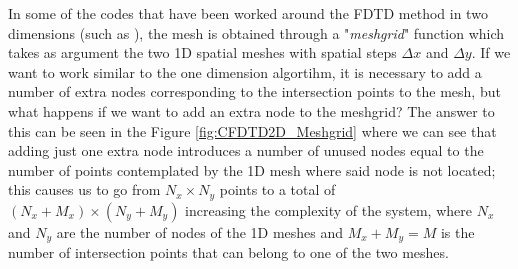\documentclass[12pt, oneside]{book}
\begin{document}
In some of the codes that have been worked around the FDTD method in two dimensions (such as \cite{Angulo_PyDG1D_2024}), the mesh is obtained through a "\textit{meshgrid}" function \cite{harris2020array} which takes as argument the two 1D spatial meshes with spatial steps $\Delta x$ and $\Delta y$. If we want to work similar to the one dimension algortihm, it is necessary to add a number of extra nodes corresponding to the intersection points to the mesh, but what happens if we want to add an extra node to the meshgrid? The answer to this can be seen in the Figure \ref{fig:CFDTD2D_Meshgrid} where we can see that adding just one extra node introduces a number of unused nodes equal to the number of points contemplated by the 1D mesh where said node is not located; this causes us to go from $N_x \times N_y$ points to a total of $(N_x + M_x) \times (N_y + M_y)$ increasing the complexity of the system, where $N_x$ and $N_y$ are the number of nodes of the 1D meshes and $M_x + M_y = M$ is the number of intersection points that can belong to one of the two meshes. 
\end{document}
